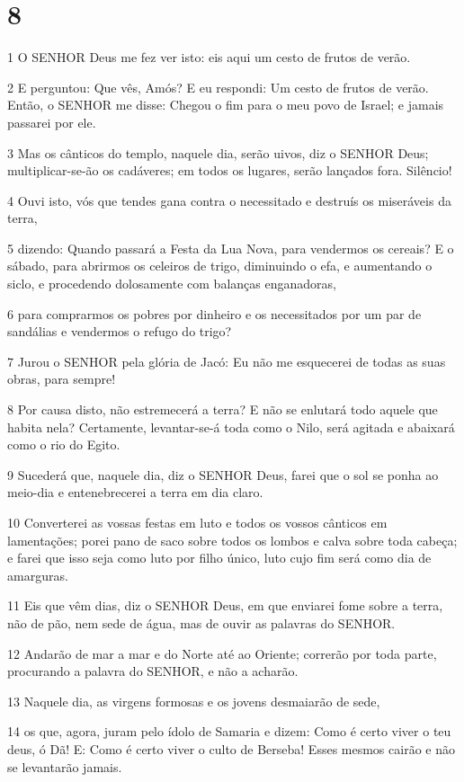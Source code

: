 \chapter{8}

\par 1 O SENHOR Deus me fez ver isto: eis aqui um cesto de frutos de verão.
\par 2 E perguntou: Que vês, Amós? E eu respondi: Um cesto de frutos de verão. Então, o SENHOR me disse: Chegou o fim para o meu povo de Israel; e jamais passarei por ele.
\par 3 Mas os cânticos do templo, naquele dia, serão uivos, diz o SENHOR Deus; multiplicar-se-ão os cadáveres; em todos os lugares, serão lançados fora. Silêncio!
\par 4 Ouvi isto, vós que tendes gana contra o necessitado e destruís os miseráveis da terra,
\par 5 dizendo: Quando passará a Festa da Lua Nova, para vendermos os cereais? E o sábado, para abrirmos os celeiros de trigo, diminuindo o efa, e aumentando o siclo, e procedendo dolosamente com balanças enganadoras,
\par 6 para comprarmos os pobres por dinheiro e os necessitados por um par de sandálias e vendermos o refugo do trigo?
\par 7 Jurou o SENHOR pela glória de Jacó: Eu não me esquecerei de todas as suas obras, para sempre!
\par 8 Por causa disto, não estremecerá a terra? E não se enlutará todo aquele que habita nela? Certamente, levantar-se-á toda como o Nilo, será agitada e abaixará como o rio do Egito.
\par 9 Sucederá que, naquele dia, diz o SENHOR Deus, farei que o sol se ponha ao meio-dia e entenebrecerei a terra em dia claro.
\par 10 Converterei as vossas festas em luto e todos os vossos cânticos em lamentações; porei pano de saco sobre todos os lombos e calva sobre toda cabeça; e farei que isso seja como luto por filho único, luto cujo fim será como dia de amarguras.
\par 11 Eis que vêm dias, diz o SENHOR Deus, em que enviarei fome sobre a terra, não de pão, nem sede de água, mas de ouvir as palavras do SENHOR.
\par 12 Andarão de mar a mar e do Norte até ao Oriente; correrão por toda parte, procurando a palavra do SENHOR, e não a acharão.
\par 13 Naquele dia, as virgens formosas e os jovens desmaiarão de sede,
\par 14 os que, agora, juram pelo ídolo de Samaria e dizem: Como é certo viver o teu deus, ó Dã! E: Como é certo viver o culto de Berseba! Esses mesmos cairão e não se levantarão jamais.

